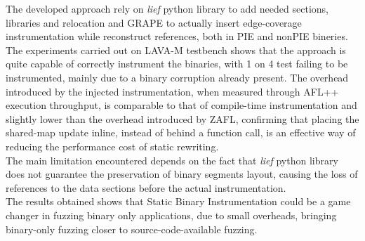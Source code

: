 \documentclass{report}
\begin{document}
            The developed approach rely on \textit{lief} python library to add needed sections, libraries and relocation and GRAPE
            to actually insert edge-coverage instrumentation while reconstruct references, both in PIE and nonPIE bineries.\\

            The experiments carried out on LAVA-M testbench shows that the approach is quite capable of correctly instrument the binaries,
            with 1 on 4 test failing to be instrumented, mainly due to a binary corruption already present.
            The overhead introduced by the injected instrumentation, when measured through AFL++ execution throughput, 
            is comparable to that of compile-time instrumentation and slightly lower than the overhead introduced by ZAFL, 
            confirming that placing the shared-map update inline, instead of behind a function call, is an effective way 
            of reducing the performance cost of static rewriting.\\

            The main limitation encountered depends on the fact that \textit{lief} python library does not guarantee
            the preservation of binary segments layout, causing the loss of references to the data sections before the actual instrumentation.\\

            The results obtained shows that Static Binary Instrumentation could be a game changer in fuzzing binary only applications,
            due to small overheads, bringing binary-only fuzzing closer to source-code-available fuzzing.
\end{document}
